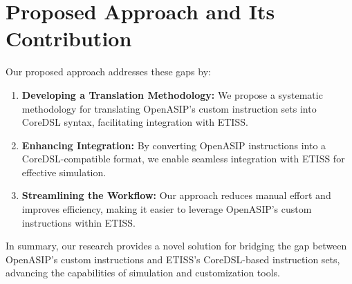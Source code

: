\section{Proposed Approach and Its Contribution}

Our proposed approach addresses these gaps by:

\begin{enumerate}

    \item \textbf{Developing a Translation Methodology:}
    We propose a systematic methodology for translating OpenASIP's custom instruction sets into CoreDSL syntax, facilitating integration with ETISS.

    \item \textbf{Enhancing Integration:}
    By converting OpenASIP instructions into a CoreDSL-compatible format, we enable seamless integration with ETISS for effective simulation.

    \item \textbf{Streamlining the Workflow:}
    Our approach reduces manual effort and improves efficiency, making it easier to leverage OpenASIP's custom instructions within ETISS.

\end{enumerate}

In summary, our research provides a novel solution for bridging the gap between OpenASIP's custom instructions and ETISS's CoreDSL-based instruction sets,
advancing the capabilities of simulation and customization tools.